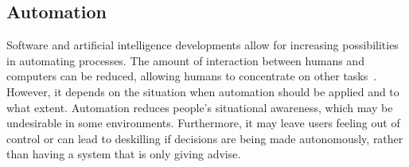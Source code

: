 

\subsection{Automation}
Software and artificial intelligence developments allow for increasing possibilities in automating processes. The amount of interaction between humans and computers can be reduced, allowing humans to concentrate on other tasks~\cite{payne2000varying}. However, it depends on the situation when automation should be applied and to what extent. Automation reduces people's situational awareness, which may be undesirable in some environments. Furthermore, it may leave users feeling out of control or can lead to deskilling if decisions are being made autonomously, rather than having a system that is only giving advise.

